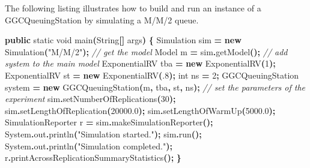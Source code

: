 \documentclass[
]{book}
\newenvironment{Shaded}{\begin{snugshade}}{\end{snugshade}}
\newcommand{\BuiltInTok}[1]{#1}
\newcommand{\CommentTok}[1]{\textcolor[rgb]{0.56,0.35,0.01}{\textit{#1}}}
\newcommand{\DataTypeTok}[1]{\textcolor[rgb]{0.13,0.29,0.53}{#1}}
\newcommand{\DecValTok}[1]{\textcolor[rgb]{0.00,0.00,0.81}{#1}}
\newcommand{\FloatTok}[1]{\textcolor[rgb]{0.00,0.00,0.81}{#1}}
\newcommand{\FunctionTok}[1]{\textcolor[rgb]{0.00,0.00,0.00}{#1}}
\newcommand{\KeywordTok}[1]{\textcolor[rgb]{0.13,0.29,0.53}{\textbf{#1}}}
\newcommand{\NormalTok}[1]{#1}
\newcommand{\OperatorTok}[1]{\textcolor[rgb]{0.81,0.36,0.00}{\textbf{#1}}}
\newcommand{\StringTok}[1]{\textcolor[rgb]{0.31,0.60,0.02}{#1}}
\theoremstyle{definition}
\theoremstyle{definition}
\theoremstyle{definition}
\theoremstyle{definition}
\theoremstyle{remark}
\begin{document}
The following listing illustrates how to build and run an
instance of a GGCQueuingStation by simulating a M/M/2 queue.

\begin{Shaded}
\begin{Highlighting}[]
    \KeywordTok{public} \DataTypeTok{static} \DataTypeTok{void} \FunctionTok{main}\OperatorTok{(}\BuiltInTok{String}\OperatorTok{[]}\NormalTok{ args}\OperatorTok{)} \OperatorTok{\{}
\NormalTok{        Simulation sim }\OperatorTok{=} \KeywordTok{new} \FunctionTok{Simulation}\OperatorTok{(}\StringTok{"M/M/2"}\OperatorTok{);}
        \CommentTok{// get the model}
\NormalTok{        Model m }\OperatorTok{=}\NormalTok{ sim}\OperatorTok{.}\FunctionTok{getModel}\OperatorTok{();}
        \CommentTok{// add system to the main model}
\NormalTok{        ExponentialRV tba }\OperatorTok{=} \KeywordTok{new} \FunctionTok{ExponentialRV}\OperatorTok{(}\DecValTok{1}\OperatorTok{);}
\NormalTok{        ExponentialRV st }\OperatorTok{=} \KeywordTok{new} \FunctionTok{ExponentialRV}\OperatorTok{(}\FloatTok{.8}\OperatorTok{);}
        \DataTypeTok{int}\NormalTok{ ns }\OperatorTok{=} \DecValTok{2}\OperatorTok{;}
\NormalTok{        GGCQueuingStation system }\OperatorTok{=} \KeywordTok{new} \FunctionTok{GGCQueuingStation}\OperatorTok{(}\NormalTok{m}\OperatorTok{,}\NormalTok{ tba}\OperatorTok{,}\NormalTok{ st}\OperatorTok{,}\NormalTok{ ns}\OperatorTok{);}
        \CommentTok{// set the parameters of the experiment}
\NormalTok{        sim}\OperatorTok{.}\FunctionTok{setNumberOfReplications}\OperatorTok{(}\DecValTok{30}\OperatorTok{);}
\NormalTok{        sim}\OperatorTok{.}\FunctionTok{setLengthOfReplication}\OperatorTok{(}\FloatTok{20000.0}\OperatorTok{);}
\NormalTok{        sim}\OperatorTok{.}\FunctionTok{setLengthOfWarmUp}\OperatorTok{(}\FloatTok{5000.0}\OperatorTok{);}
\NormalTok{        SimulationReporter r }\OperatorTok{=}\NormalTok{ sim}\OperatorTok{.}\FunctionTok{makeSimulationReporter}\OperatorTok{();}
        \BuiltInTok{System}\OperatorTok{.}\FunctionTok{out}\OperatorTok{.}\FunctionTok{println}\OperatorTok{(}\StringTok{"Simulation started."}\OperatorTok{);}
\NormalTok{        sim}\OperatorTok{.}\FunctionTok{run}\OperatorTok{();}
        \BuiltInTok{System}\OperatorTok{.}\FunctionTok{out}\OperatorTok{.}\FunctionTok{println}\OperatorTok{(}\StringTok{"Simulation completed."}\OperatorTok{);}
\NormalTok{        r}\OperatorTok{.}\FunctionTok{printAcrossReplicationSummaryStatistics}\OperatorTok{();}
    \OperatorTok{\}}
\end{Highlighting}
\end{Shaded}
\end{document}
